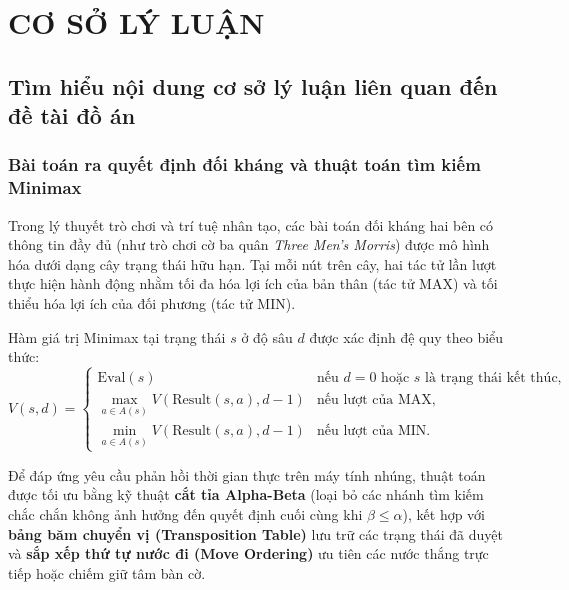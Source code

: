 \documentclass[12pt,a4paper]{report}
\begin{document}
	\chapter{CƠ SỞ LÝ LUẬN}
	
	\section{Tìm hiểu nội dung cơ sở lý luận liên quan đến đề tài đồ án}
	
	\subsection{Bài toán ra quyết định đối kháng và thuật toán tìm kiếm Minimax}
	Trong lý thuyết trò chơi và trí tuệ nhân tạo, các bài toán đối kháng hai bên có thông tin đầy đủ (như trò chơi cờ ba quân \textit{Three Men's Morris}) được mô hình hóa dưới dạng cây trạng thái hữu hạn. Tại mỗi nút trên cây, hai tác tử lần lượt thực hiện hành động nhằm tối đa hóa lợi ích của bản thân (tác tử MAX) và tối thiểu hóa lợi ích của đối phương (tác tử MIN).
	
	Hàm giá trị Minimax tại trạng thái $s$ ở độ sâu $d$ được xác định đệ quy theo biểu thức:
	\begin{equation}
		V(s, d) =
		\begin{cases}
			\text{Eval}(s) & \text{nếu } d = 0 \text{ hoặc } s \text{ là trạng thái kết thúc}, \\
			\max_{a \in A(s)} V(\text{Result}(s, a), d - 1) & \text{nếu lượt của MAX}, \\
			\min_{a \in A(s)} V(\text{Result}(s, a), d - 1) & \text{nếu lượt của MIN}.
		\end{cases}
	\end{equation}
	
	Để đáp ứng yêu cầu phản hồi thời gian thực trên máy tính nhúng, thuật toán được tối ưu bằng kỹ thuật \textbf{cắt tỉa Alpha-Beta} (loại bỏ các nhánh tìm kiếm chắc chắn không ảnh hưởng đến quyết định cuối cùng khi $\beta \le \alpha$), kết hợp với \textbf{bảng băm chuyển vị (Transposition Table)} lưu trữ các trạng thái đã duyệt và \textbf{sắp xếp thứ tự nước đi (Move Ordering)} ưu tiên các nước thắng trực tiếp hoặc chiếm giữ tâm bàn cờ.
	
\end{document}
